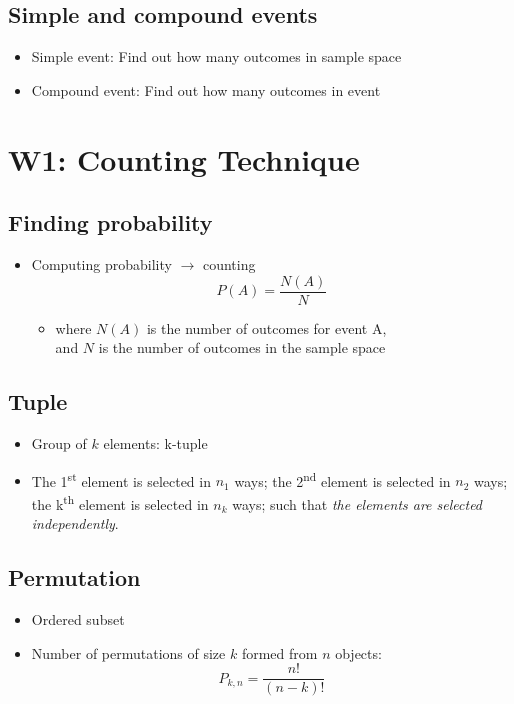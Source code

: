 \documentclass[a4paper]{article}
\begin{document}
\subsection{Simple and compound events}
\begin{itemize}
    \item Simple event: Find out how many outcomes in sample space
    \item Compound event: Find out how many outcomes in event
\end{itemize}
\newpage
\section{W1: Counting Technique}
\subsection{Finding probability}
\begin{itemize}
    \item Computing probability $\rightarrow{}$ counting
    $$P(A) = \frac{N(A)}{N}$$
    \begin{itemize}[label=$\circ$]
        \item where $N(A)$ is the number of outcomes for event A, \\and $N$ is the number of outcomes in the sample space  
    \end{itemize}
\end{itemize}
\subsection{Tuple}
\begin{itemize}
    \item Group of $k$ elements: k-tuple
    \item The 1\textsuperscript{st} element is selected in $n_1$ ways;
    the 2\textsuperscript{nd} element is selected in $n_2$ ways; the k\textsuperscript{th} element is selected in $n_k$ ways; such that \textit{the elements are selected independently}.
\end{itemize}
\subsection{Permutation}
\begin{itemize}
    \item Ordered subset
    \item Number of permutations of size $k$ formed from $n$ objects:
    $$P_{k, n} = \frac{n!}{(n-k)!}$$
\end{itemize}
\end{document}
